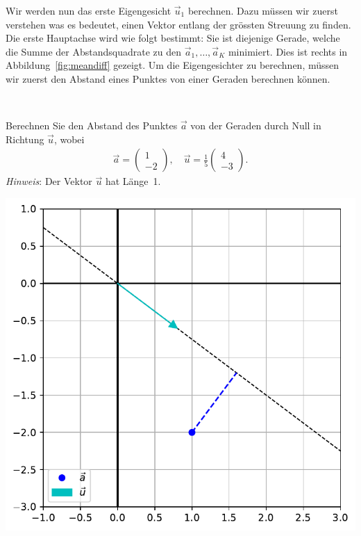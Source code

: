 Wir werden nun das erste Eigengesicht $\vec{u}_1$ berechnen.
Dazu müssen wir zuerst verstehen was es bedeutet, einen Vektor \glqq{}entlang der grössten Streuung\grqq{} zu finden.
Die erste Hauptachse wird wie folgt bestimmt:
Sie ist diejenige Gerade, welche die Summe der Abstandsquadrate zu den $\vec{a}_1,\ldots,\vec{a}_K$ minimiert.
Dies ist rechts in Abbildung~\ref{fig:meandiff} gezeigt.
Um die Eigengesichter zu berechnen, müssen wir zuerst den Abstand eines Punktes von einer Geraden berechnen können.
\begin{aufgabe} \label{aufg:distance_simple}
	\phantom{text}\\
	\begin{minipage}{0.55\textwidth}
		Berechnen Sie den Abstand des Punktes $\vec{a}$ von der Geraden durch Null in Richtung $\vec{u}$, wobei
		\begin{align*}
			\vec{a}=
			\begin{pmatrix}
				1 \\
				-2
			\end{pmatrix},\quad
			\vec{u}=\frac{1}{5}
			\begin{pmatrix}
				4 \\
				-3
			\end{pmatrix}.
		\end{align*}
		\textit{Hinweis}: Der Vektor $\vec{u}$ hat Länge~1.
	\end{minipage}\hfill
	\begin{minipage}{0.4\textwidth}
		\includegraphics[width=\textwidth]{images/facespace/distance_simple}
	\end{minipage}
\end{aufgabe}
